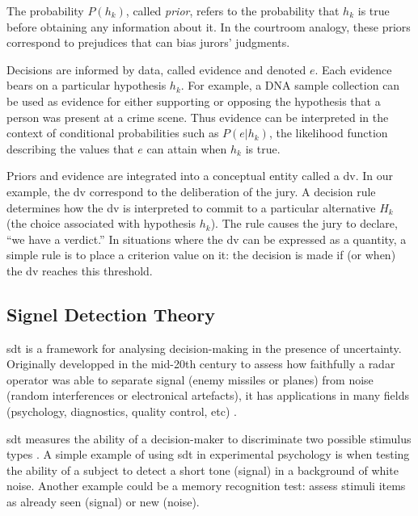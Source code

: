 The probability $P(h_k)$, called \textit{prior}, refers to the probability that $h_k$ is true before obtaining any information about it. In the courtroom analogy, these priors correspond to prejudices that can bias jurors’ judgments.

Decisions are informed by data, called evidence and denoted $e$. Each evidence bears on a particular hypothesis $h_k$. For example, a DNA sample collection can be used as evidence for either supporting or opposing the hypothesis that a person was present at a crime scene. Thus evidence can be interpreted in the context of conditional probabilities such as $P(e|h_k)$, the likelihood function describing the values that $e$ can attain when $h_k$ is true.

Priors and evidence  are integrated into a conceptual entity called a \acrfull{dv}. In our example, the \acrshort{dv} correspond to the deliberation of the jury. A decision rule determines how the \acrshort{dv} is interpreted to commit to a particular alternative $H_k$ (the choice associated with hypothesis $h_k$). The rule causes the jury to declare, “we have a verdict.” In situations where the \acrshort{dv} can be expressed as a quantity, a simple rule is to place a criterion value on it: the decision is made if (or when) the \acrshort{dv} reaches this threshold.


\subsection{Signel Detection Theory}

\acrfull{sdt} is a framework for analysing \gls{decision-making} in the presence of  \gls{uncertainty}. Originally developped in the mid-20th century to assess how faithfully a radar operator was able to separate signal (enemy missiles or planes) from noise (random interferences or electronical artefacts), it has applications in many fields (psychology, diagnostics, quality control, etc) \cite{green1966signal}.

\acrshort{sdt} measures the ability of a decision-maker to discriminate two possible stimulus types \cite{stanislawCalculationSignalDetection1999}. A simple example of using \acrshort{sdt} in experimental psychology is when testing the ability of a subject to detect a short tone (signal) in a background of white noise. Another example could be a memory recognition test: assess stimuli items as already seen (signal) or new (noise).

